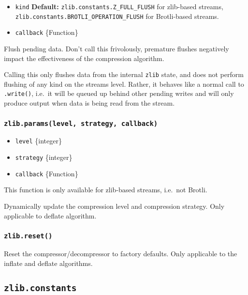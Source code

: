 \begin{itemize}
\tightlist
\item
  \texttt{kind} \textbf{Default:} \texttt{zlib.constants.Z\_FULL\_FLUSH}
  for zlib-based streams,
  \texttt{zlib.constants.BROTLI\_OPERATION\_FLUSH} for Brotli-based
  streams.
\item
  \texttt{callback} \{Function\}
\end{itemize}

Flush pending data. Don't call this frivolously, premature flushes
negatively impact the effectiveness of the compression algorithm.

Calling this only flushes data from the internal \texttt{zlib} state,
and does not perform flushing of any kind on the streams level. Rather,
it behaves like a normal call to \texttt{.write()}, i.e.~it will be
queued up behind other pending writes and will only produce output when
data is being read from the stream.

\subsubsection{\texorpdfstring{\texttt{zlib.params(level,\ strategy,\ callback)}}{zlib.params(level, strategy, callback)}}\label{zlib.paramslevel-strategy-callback}

\begin{itemize}
\tightlist
\item
  \texttt{level} \{integer\}
\item
  \texttt{strategy} \{integer\}
\item
  \texttt{callback} \{Function\}
\end{itemize}

This function is only available for zlib-based streams, i.e.~not Brotli.

Dynamically update the compression level and compression strategy. Only
applicable to deflate algorithm.

\subsubsection{\texorpdfstring{\texttt{zlib.reset()}}{zlib.reset()}}\label{zlib.reset}

Reset the compressor/decompressor to factory defaults. Only applicable
to the inflate and deflate algorithms.

\subsection{\texorpdfstring{\texttt{zlib.constants}}{zlib.constants}}\label{zlib.constants}

